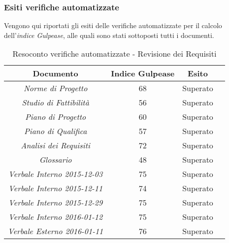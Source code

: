 \subsubsection{Esiti verifiche automatizzate}
Vengono qui riportati gli esiti delle verifiche automatizzate per il calcolo dell'\textit{indice Gulpease}, alle quali sono stati sottoposti tutti i documenti.
\begin{table}[h]
\begin{center}
\begin{tabular}{|c|c|c|c|}
\hline Documento & Indice Gulpease & Esito\\
\hline
\emph{Norme di Progetto} & 68  & Superato \\
\emph{Studio di Fattibilità} & 56 & Superato \\
\emph{Piano di Progetto} & 60 & Superato \\
\emph{Piano di Qualifica} & 57  & Superato \\
\emph{Analisi dei Requisiti} & 72 & Superato \\
\emph{Glossario} & 48 & Superato \\
\emph{Verbale Interno 2015-12-03} & 75 & Superato \\
\emph{Verbale Interno 2015-12-11} & 74 & Superato \\
\emph{Verbale Interno 2015-12-29} & 75 & Superato \\
\emph{Verbale Interno 2016-01-12} & 75 & Superato \\
\emph{Verbale Esterno 2016-01-11} & 76 & Superato \\
\hline
\end{tabular}
\caption{Resoconto verifiche automatizzate - Revisione dei Requisiti}
\end{center}
\end{table}

